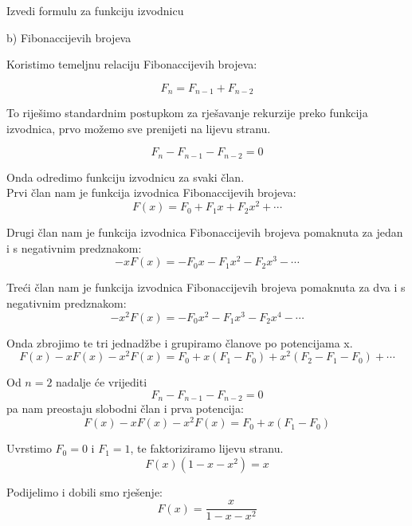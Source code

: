 \documentclass{article}
\begin{document}
	Izvedi formulu za funkciju izvodnicu
	
	b) Fibonaccijevih brojeva
	
	Koristimo temeljnu relaciju Fibonaccijevih brojeva:
	
	\[ F_n = F_{n - 1} + F_{n - 2} \]
	
	To riješimo standardnim postupkom za rješavanje rekurzije preko funkcija izvodnica, prvo možemo sve prenijeti na lijevu stranu.
	
	\[ F_n - F_{n - 1} - F_{n - 2} = 0 \]
	
	Onda odredimo funkciju izvodnicu za svaki član. \\
	
	Prvi član nam je funkcija izvodnica Fibonaccijevih brojeva: 
	\[ F(x) = F_0 + F_1 x + F_2 x^2 + \cdots \]
	
	Drugi član nam je funkcija izvodnica Fibonaccijevih brojeva pomaknuta za jedan i s negativnim predznakom:
	\[ - x F(x) = - F_0 x - F_1 x^2 - F_2 x^3 - \cdots \]
	
	Treći član nam je funkcija izvodnica Fibonaccijevih brojeva pomaknuta za dva i s negativnim predznakom:
	\[ - x^2 F(x) = - F_0 x^2 - F_1 x^3 - F_2 x^4 - \cdots \]
	
	Onda zbrojimo te tri jednadžbe i grupiramo članove po potencijama x.
	\[ F(x) - x F(x) - x^2 F(x) = F_0 + x (F_1 - F_0) + x^2 (F_2 - F_1 - F_0) + \cdots \]
	
	Od \( n = 2 \) nadalje će vrijediti \[ F_n - F_{n - 1} - F_{n - 2} = 0 \] pa nam preostaju slobodni član i prva potencija:
	\[ F(x) - x F(x) - x^2 F(x) = F_0 + x (F_1 - F_0) \]
	
	Uvrstimo \( F_0 = 0 \) i \( F_1 = 1 \), te faktoriziramo lijevu stranu.
	\[ F(x)(1 - x - x^2) = x \]
	
	Podijelimo i dobili smo rješenje:
	\[ F(x) = \frac{x}{1 - x - x^2} \]
\end{document}
